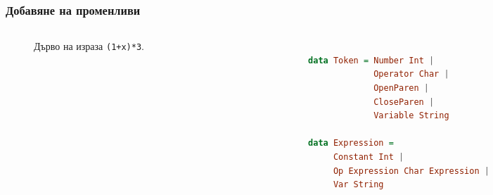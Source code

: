 \documentclass{beamer}
\begin{document}
\begin{frame}[fragile]
  \frametitle{Добавяне на променливи}


\begin{columns}[t]
  \begin{column}{0.3\textwidth}

    \begin{figure}
      \centering
      \caption{Дърво на израза \texttt{(1+x)*3}.}
      \label{fig:treeexpr}
      \end{figure}
      

  \end{column}
  \begin{column}{0.7\textwidth}

\begin{lstlisting}[basicstyle=\small,language=Haskell]

data Token = Number Int | 
             Operator Char | 
             OpenParen | 
             CloseParen |
             Variable String

data Expression = 
     Constant Int | 
     Op Expression Char Expression |
     Var String
     

\end{lstlisting}

  \end{column}
\end{columns}

\end{frame}  
\end{document}
